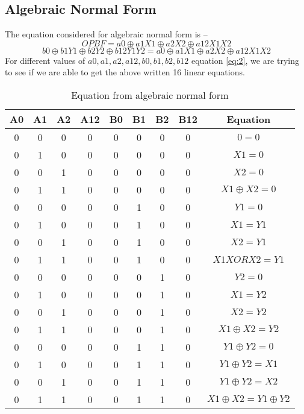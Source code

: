 \documentclass[12pt]{article}
\begin{document}
\subsection{Algebraic Normal Form}
The equation considered for algebraic normal form is – 
\begin{equation}
    \label{eq:1}
    OPBF=a0 \oplus a1 X1 \oplus a2 X2 \oplus a12 X1 X2
\end{equation}
\begin{equation}
    \label{eq:2}
    b0 \oplus b1 Y1 \oplus b2 Y2 \oplus b12 Y1 Y2=a0 \oplus a1 X1 \oplus a2 X2 \oplus a12 X1 X2
\end{equation}
For different values of $ a0, a1, a2, a12, b0, b1, b2, b12 $ equation \ref{eq:2}, we are trying to see if we are able to get the above written 16 linear equations. 
\begin{table}[H]
    \centering
    \begin{tabular}{|c|c|c|c|c|c|c|c|c|}
        \hline
        A0 & A1 & A2 & A12 & B0 & B1 & B2 & B12 & Equation \\
        \hline
        0  & 0  & 0  & 0   & 0  & 0  & 0  & 0   & $ 0=0 $ \\
        \hline
        0  & 1  & 0  & 0   & 0  & 0  & 0  & 0   & $ X1=0 $ \\
        \hline
        0  & 0  & 1  & 0   & 0  & 0  & 0  & 0   & $ X2=0 $ \\
        \hline
        0  & 1  & 1  & 0   & 0  & 0  & 0  & 0   & $ X1 \oplus X2=0 $ \\
        \hline
        0  & 0  & 0  & 0   & 0  & 1  & 0  & 0   & $ Y1=0 $ \\
        \hline
        0  & 1  & 0  & 0   & 0  & 1  & 0  & 0   & $ X1=Y1 $ \\
        \hline
        0  & 0  & 1  & 0   & 0  & 1  & 0  & 0   & $ X2=Y1 $ \\
        \hline
        0  & 1  & 1  & 0   & 0  & 1  & 0  & 0   & $ X1 XOR X2=Y1 $ \\
        \hline
        0  & 0  & 0  & 0   & 0  & 0  & 1  & 0   & $ Y2=0 $ \\
        \hline
        0  & 1  & 0  & 0   & 0  & 0  & 1  & 0   & $ X1=Y2 $ \\
        \hline
        0  & 0  & 1  & 0   & 0  & 0  & 1  & 0   & $ X2=Y2 $ \\
        \hline
        0  & 1  & 1  & 0   & 0  & 0  & 1  & 0   & $ X1 \oplus X2=Y2 $ \\
        \hline
        0  & 0  & 0  & 0   & 0  & 1  & 1  & 0   & $ Y1 \oplus Y2=0 $ \\
        \hline
        0  & 1  & 0  & 0   & 0  & 1  & 1  & 0   & $ Y1 \oplus Y2=X1 $ \\
        \hline
        0  & 0  & 1  & 0   & 0  & 1  & 1  & 0   & $ Y1 \oplus Y2=X2 $ \\
        \hline
        0  & 1  & 1  & 0   & 0  & 1  & 1  & 0   & $ X1 \oplus X2=Y1 \oplus Y2 $ \\
        \hline
    \end{tabular}
    \caption{Equation from algebraic normal form}
    \label{table:5}
\end{table}
\end{document}

